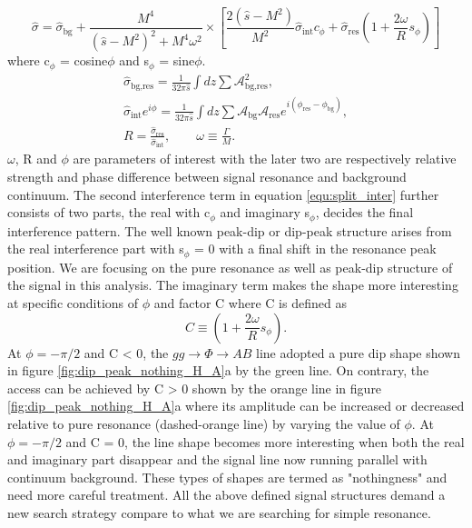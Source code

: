 \begin{equation}\label{equ:split_inter}
\hat{\sigma}=\hat{\sigma}_{\text{bg}}+\frac{M^{4}}{\left(\hat{s}-M^{2}\right)^{2}+M^{4}\omega^{2}}\times\left[\frac{2\left(\hat{s}-M^{2}\right)}{M^{2}}\hat{\sigma}_{\text{int}}c_{\phi}+\hat{\sigma}_{\text{res}}\left(1+\frac{2\omega}{R}s_{\phi} \right) \right]
\end{equation}
where c$_{\phi}$ = cosine$\phi$ and s$_{\phi}$ = sine$\phi$.
\begin{equation}\label{equ:inter_variables}
\begin{split}
\hat{\sigma}_{\text{bg,res}}=\frac{1}{32\pi\hat{s}}\int dz \sum \mathcal{A}^{2}_{\text{bg,res}},\\
\hat{\sigma}_{\text{int}}e^{i\phi}=\frac{1}{32\pi\hat{s}}\int dz \sum \mathcal{A}_{\text{bg}}\mathcal{A}_{\text{res}}e^{i\left(\phi_{\text{res}}-\phi_{\text{bg}}\right)},\\
R=\frac{\hat{\sigma}_{\text{res}}}{\hat{\sigma}_{\text{int}}},\qquad \omega \equiv \frac{\Gamma}{M}.
\end{split}
\end{equation}
\noindent $\omega$, R and  $\phi$ are parameters of interest with the later two are respectively relative strength and phase difference between signal resonance and background continuum. The second interference term in equation \ref{equ:split_inter} further consists of two parts, the real with $\text{c}_{\phi}$ and imaginary s$_{\phi}$, decides the final interference pattern. The well known peak-dip or dip-peak structure arises from the real interference part with s$_{\phi}$ = 0 with a final shift in the resonance peak position. We are focusing on the pure resonance as well as peak-dip structure of the signal in this analysis. The imaginary term makes the shape more interesting at specific conditions of $\phi$ and factor C where C is defined as
\begin{equation}\label{equ:correction_term}
C \equiv \left(1+\frac{2\omega}{R}s_{\phi} \right).
\end{equation} 
At $\phi=-\pi /2$ and C < 0, the $gg\rightarrow\Phi\rightarrow AB$ line adopted a pure dip shape shown in figure \ref{fig:dip_peak_nothing_H_A}a by the green line. On contrary, the access can be achieved by C > 0 shown by the orange line in figure \ref{fig:dip_peak_nothing_H_A}a where its amplitude can be increased or decreased relative to pure resonance (dashed-orange line) by varying the value of $\phi$. At $\phi=-\pi /2$ and C = 0, the line shape becomes more interesting when both the real and imaginary part disappear and the signal line now running parallel with continuum background. These types of shapes are termed as "nothingness" and need more careful treatment. All the above defined signal structures demand a new search strategy compare to what we are searching for simple resonance. 


